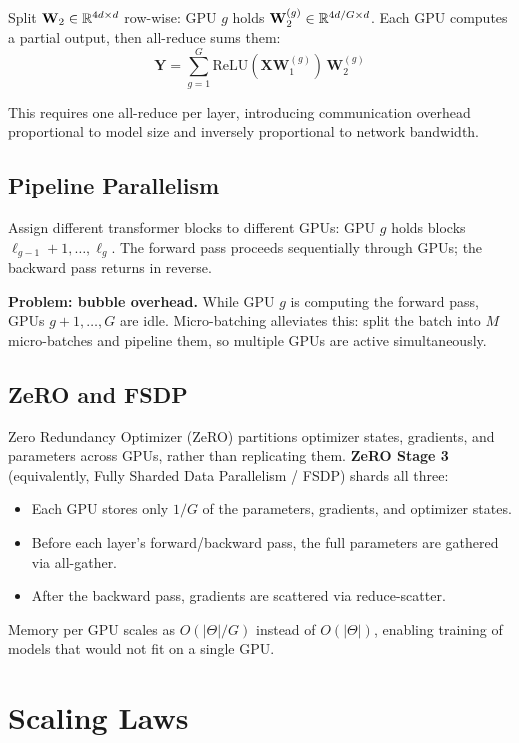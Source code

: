 \documentclass[main.tex]{subfiles}
\begin{document}
Split $\mathbf{W}_2 \in \mathbb{R}^{4d \times d}$ row-wise: GPU $g$ holds $\mathbf{W}_2^{(g)} \in \mathbb{R}^{4d/G \times d}$. Each GPU computes a partial output, then all-reduce sums them:
$$\mathbf{Y} = \sum_{g=1}^{G}\text{ReLU}(\mathbf{X}\mathbf{W}_1^{(g)})\,\mathbf{W}_2^{(g)}$$

This requires one all-reduce per layer, introducing communication overhead proportional to model size and inversely proportional to network bandwidth.

\subsection{Pipeline Parallelism}

Assign different transformer blocks to different GPUs: GPU $g$ holds blocks $\ell_{g-1}+1, \ldots, \ell_g$. The forward pass proceeds sequentially through GPUs; the backward pass returns in reverse.

\textbf{Problem: bubble overhead.} While GPU $g$ is computing the forward pass, GPUs $g+1, \ldots, G$ are idle. Micro-batching alleviates this: split the batch into $M$ micro-batches and pipeline them, so multiple GPUs are active simultaneously.

\subsection{ZeRO and FSDP}

Zero Redundancy Optimizer (ZeRO) partitions optimizer states, gradients, and parameters across GPUs, rather than replicating them. \textbf{ZeRO Stage 3} (equivalently, Fully Sharded Data Parallelism / FSDP) shards all three:
\begin{itemize}
    \item Each GPU stores only $1/G$ of the parameters, gradients, and optimizer states.
    \item Before each layer's forward/backward pass, the full parameters are gathered via all-gather.
    \item After the backward pass, gradients are scattered via reduce-scatter.
\end{itemize}

Memory per GPU scales as $O(|\Theta|/G)$ instead of $O(|\Theta|)$, enabling training of models that would not fit on a single GPU.

\needspace{0.33\textheight}
\section{Scaling Laws}
\end{document}
